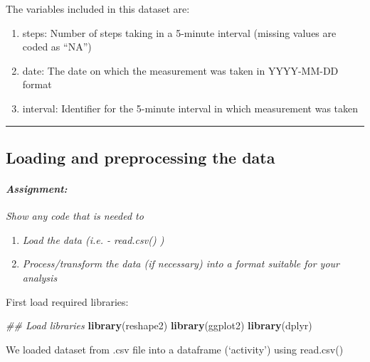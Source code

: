 \documentclass[]{article}
\newenvironment{Shaded}{\begin{snugshade}}{\end{snugshade}}
\newcommand{\CommentTok}[1]{\textcolor[rgb]{0.56,0.35,0.01}{\textit{#1}}}
\newcommand{\KeywordTok}[1]{\textcolor[rgb]{0.13,0.29,0.53}{\textbf{#1}}}
\newcommand{\NormalTok}[1]{#1}
\providecommand{\tightlist}{%
  \setlength{\itemsep}{0pt}\setlength{\parskip}{0pt}}
\let\oldparagraph\paragraph
\renewcommand{\paragraph}[1]{\oldparagraph{#1}\mbox{}}
\begin{document}
The variables included in this dataset are:

\begin{enumerate}
\def\labelenumi{\arabic{enumi}.}
\tightlist
\item
  steps: Number of steps taking in a 5-minute interval (missing values
  are coded as ``NA'')
\item
  date: The date on which the measurement was taken in YYYY-MM-DD format
\item
  interval: Identifier for the 5-minute interval in which measurement
  was taken
\end{enumerate}

\begin{center}\rule{0.5\linewidth}{\linethickness}\end{center}

\hypertarget{loading-and-preprocessing-the-data}{%
\subsection{Loading and preprocessing the
data}\label{loading-and-preprocessing-the-data}}

\hypertarget{assignment-1}{%
\paragraph{\texorpdfstring{\emph{Assignment:}}{Assignment:}}\label{assignment-1}}

\emph{Show any code that is needed to}

\begin{enumerate}
\def\labelenumi{\arabic{enumi}.}
\tightlist
\item
  \emph{Load the data (i.e. - read.csv() ) }\\
\item
  \emph{Process/transform the data (if necessary) into a format suitable
  for your analysis}
\end{enumerate}

First load required libraries:

\begin{Shaded}
\begin{Highlighting}[]
\CommentTok{## Load  libraries}
\KeywordTok{library}\NormalTok{(reshape2)}
\KeywordTok{library}\NormalTok{(ggplot2)}
\KeywordTok{library}\NormalTok{(dplyr)}
\end{Highlighting}
\end{Shaded}

We loaded dataset from .csv file into a dataframe (`activity') using
read.csv()
\end{document}
